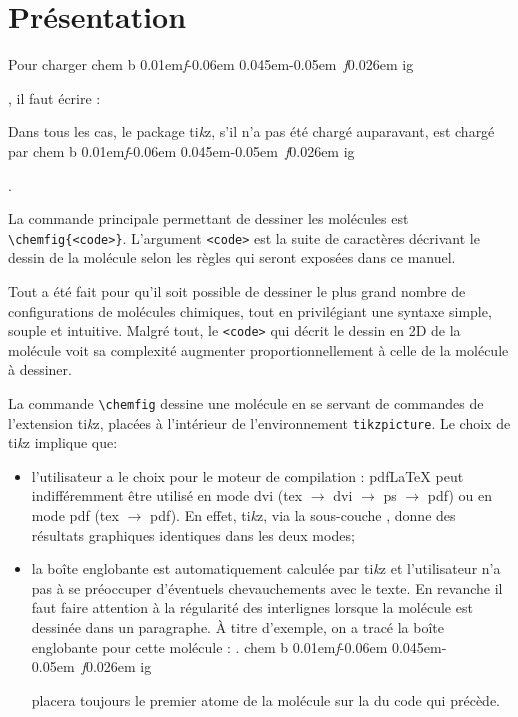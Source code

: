 \documentclass[10pt,french]{article}
\makeatletter
\newcommand\falseverb[1]{{\ttfamily\detokenize\expandafter{\string#1}}}
\DeclareRobustCommand\CF{%
	\textsf{%
		chem%
		\if\string b\detokenize\expandafter{\f@series}%
			\lower0.01em\hbox{\itshape f}\kern-0.06em
		\else
			\lower0.045em\hbox{\kern-0.05em \itshape f}\kern0.026em
		\fi ig%
		}%
		\xspace
}
\newcommand\TIKZ{ti\textit kz\xspace}
\makeatother
\begin{document}
\section{Présentation}
Pour charger \CF, il faut écrire :

Dans tous les cas, le package \TIKZ, s'il n'a pas été chargé auparavant, est chargé par \CF.

La commande principale permettant de dessiner les molécules est \verb|\chemfig{<code>}|. L'argument \verb|<code>| est la suite de caractères décrivant le dessin de la molécule selon les règles qui seront exposées dans ce manuel.

Tout a été fait pour qu'il soit possible de dessiner le plus grand nombre de configurations de molécules chimiques, tout en privilégiant une syntaxe simple, souple et intuitive. Malgré tout, le \verb-<code>- qui décrit le dessin en 2D de la molécule voit sa complexité augmenter proportionnellement à celle de la molécule à dessiner.

La commande \verb|\chemfig| dessine une molécule en se servant de commandes de l'extension \TIKZ, placées à l'intérieur de l'environnement \verb|tikzpicture|. Le choix de \TIKZ implique que:
\begin{itemize}
\item l'utilisateur a le choix pour le moteur de compilation : pdf\LaTeX{} peut indifféremment être utilisé en mode dvi (tex $\longrightarrow$ dvi $\longrightarrow$ ps $\longrightarrow$ pdf) ou en mode pdf (tex $\longrightarrow$ pdf). En effet, \TIKZ, via la sous-couche \falseverb{pgf}, donne des résultats graphiques identiques dans les deux modes;
\item la boîte englobante est automatiquement calculée par \TIKZ et l'utilisateur n'a pas à se préoccuper d'éventuels chevauchements avec le texte. En revanche il faut faire attention à la régularité des interlignes lorsque la molécule est dessinée dans un paragraphe. À titre d'exemple, on a tracé la boîte englobante pour cette molécule : { }. \CF placera toujours le premier atome de la molécule sur la \falseverb{ligne de base} du code qui précède.
\end{itemize}
\end{document}
